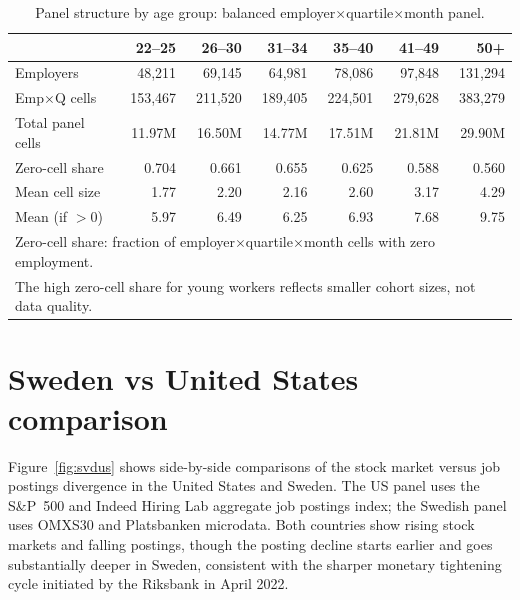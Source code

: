 \documentclass[preprint,12pt,authoryear]{elsarticle}
\begin{document}
\begin{table}[htbp]
\centering
\caption{Panel structure by age group: balanced employer$\times$quartile$\times$month panel.}
\label{tab:panel_structure}
\footnotesize
\begin{tabular}{@{}lrrrrrr@{}}
\toprule
 & 22--25 & 26--30 & 31--34 & 35--40 & 41--49 & 50+ \\
\midrule
Employers & 48,211 & 69,145 & 64,981 & 78,086 & 97,848 & 131,294 \\
Emp$\times$Q cells & 153,467 & 211,520 & 189,405 & 224,501 & 279,628 & 383,279 \\
Total panel cells & 11.97M & 16.50M & 14.77M & 17.51M & 21.81M & 29.90M \\
Zero-cell share & 0.704 & 0.661 & 0.655 & 0.625 & 0.588 & 0.560 \\[4pt]
Mean cell size & 1.77 & 2.20 & 2.16 & 2.60 & 3.17 & 4.29 \\
Mean (if $>0$) & 5.97 & 6.49 & 6.25 & 6.93 & 7.68 & 9.75 \\
\bottomrule
\multicolumn{7}{l}{\scriptsize Zero-cell share: fraction of employer$\times$quartile$\times$month cells with zero employment.} \\
\multicolumn{7}{l}{\scriptsize The high zero-cell share for young workers reflects smaller cohort sizes, not data quality.}
\end{tabular}
\end{table}

\FloatBarrier



\section{Sweden vs United States comparison}

Figure~\ref{fig:svdus} shows side-by-side comparisons of the stock market versus job postings divergence in the United States and Sweden. The US panel uses the S\&P~500 and Indeed Hiring Lab aggregate job postings index; the Swedish panel uses OMXS30 and Platsbanken microdata. Both countries show rising stock markets and falling postings, though the posting decline starts earlier and goes substantially deeper in Sweden, consistent with the sharper monetary tightening cycle initiated by the Riksbank in April 2022.
\end{document}
